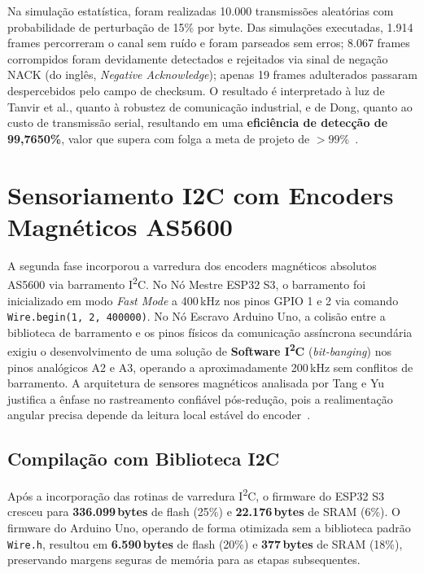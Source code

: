 Na simulação estatística, foram realizadas 10.000 transmissões aleatórias com probabilidade de perturbação de 15\% por byte. Das simulações executadas, 1.914 frames percorreram o canal sem ruído e foram parseados sem erros; 8.067 frames corrompidos foram devidamente detectados e rejeitados via sinal de negação NACK (do inglês, \textit{Negative Acknowledge}); apenas 19 frames adulterados passaram despercebidos pelo campo de checksum. O resultado é interpretado à luz de Tanvir et al., quanto à robustez de comunicação industrial, e de Dong, quanto ao custo de transmissão serial, resultando em uma \textbf{eficiência de detecção de 99,7650\%}, valor que supera com folga a meta de projeto de $>99\%$~\cite{tanvir2024optimizing, dong2022comparative}.

\section{Sensoriamento I2C com Encoders Magnéticos AS5600}
\label{sec:dev_i2c}

A segunda fase incorporou a varredura dos encoders magnéticos absolutos AS5600 via barramento I\textsuperscript{2}C. No Nó Mestre ESP32 S3, o barramento foi inicializado em modo \textit{Fast Mode} a 400\,kHz nos pinos GPIO 1 e 2 via comando \texttt{Wire.begin(1, 2, 400000)}. No Nó Escravo Arduino Uno, a colisão entre a biblioteca de barramento e os pinos físicos da comunicação assíncrona secundária exigiu o desenvolvimento de uma solução de \textbf{Software I\textsuperscript{2}C} (\textit{bit-banging}) nos pinos analógicos A2 e A3, operando a aproximadamente 200\,kHz sem conflitos de barramento. A arquitetura de sensores magnéticos analisada por Tang e Yu justifica a ênfase no rastreamento confiável pós-redução, pois a realimentação angular precisa depende da leitura local estável do encoder~\cite{tang2022research}.

\subsection{Compilação com Biblioteca I2C}
\label{subsec:dev_i2c_compilacao}

Após a incorporação das rotinas de varredura I\textsuperscript{2}C, o firmware do ESP32 S3 cresceu para \textbf{336.099\,bytes} de flash (25\%) e \textbf{22.176\,bytes} de SRAM (6\%). O firmware do Arduino Uno, operando de forma otimizada sem a biblioteca padrão \texttt{Wire.h}, resultou em \textbf{6.590\,bytes} de flash (20\%) e \textbf{377\,bytes} de SRAM (18\%), preservando margens seguras de memória para as etapas subsequentes.

